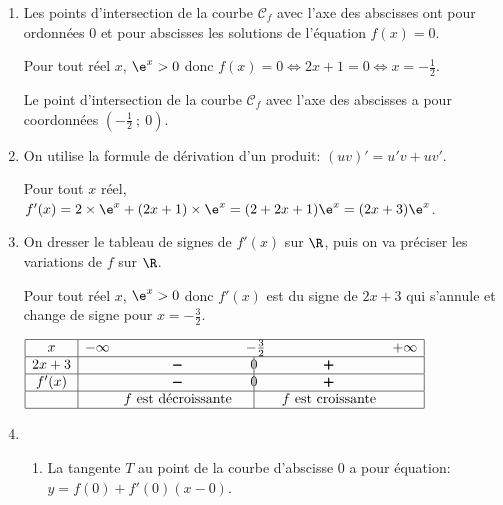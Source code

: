 \begin{enumerate}
\item  Les  points d'intersection de la courbe $\mathcal{C}_f$  avec l'axe des abscisses ont pour ordonnées 0 et pour abscisses les solutions de l'équation $f(x)=0$.

Pour tout réel $x$, $\e^{x}>0$ donc $f(x)=0 \iff 2x+1=0 \iff x = -\frac{1}{2}$.

Le point d'intersection de la courbe $\mathcal{C}_f$  avec l'axe des abscisses a pour coordonnées $\left ( -\frac{1}{2}~;~0\right )$.

\item On utilise la formule de dérivation d'un produit: $(uv)'=u'v+uv'$.

Pour tout $x$ réel,  $f'(x)= 2\times \e^{x} + (2x+1)\times \e^{x} = (2+2x+1)\e^{x} = (2x+3)\e^{x}$.

\item On dresser le tableau de signes de $f'(x)$ sur $\R$, puis on va préciser les variations de $f$ sur $\R$.

Pour tout réel $x$, $\e^{x}>0$ donc $f'(x)$ est du signe de $2x+3$ qui s'annule et change de signe pour $x=-\frac{3}{2}$.

\begin{center}
{\renewcommand{\arraystretch}{1.3}
\def\esp{\hspace*{2.5cm}}%
\def\hauteur{0pt}%
$\begin{array}{|c| *4{c} c|}
\hline
 x &-\infty  & \esp & -\frac{3}{2} & \esp & +\infty \\
  \hline
2x+3 &  &  \pmb{-} & \vline\hspace{-2.7pt}0 & \pmb{+} & \\  
 \hline
f'(x) &  &  \pmb{-} & \vline\hspace{-2.7pt}0 & \pmb{+} & \\  
\hline
 && f \text{ est décroissante} & \vline\hspace{-2.7pt}{\phantom 0} & f \text{ est croissante} & \\
\hline
\end{array}$
}
\end{center}

\item \begin{enumerate}
\item La tangente $T$ au point de la courbe d'abscisse 0 a pour équation:
$y=f(0)+f'(0)\left (x-0\right )$.


\end{enumerate}
\end{enumerate}
